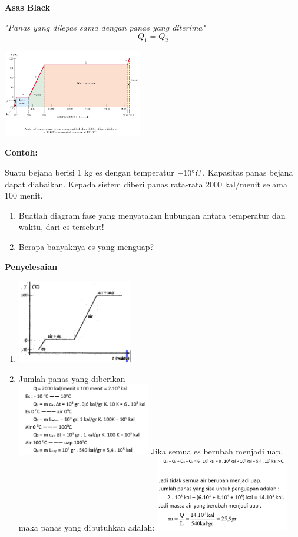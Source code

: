 \documentclass[twocolumn, 11pt]{article}%
\begin{document}
        \textbf{Asas Black}

        \textit{"Panas yang dilepas sama dengan panas yang diterima"}
        \[Q_1 = Q_2 \]

        \begin{center}
            \includegraphics[width=230px]{7.png}
        \end{center}

        \textbf{Contoh:}

        Suatu bejana berisi 1 kg es dengan temperatur $-10\degree C$. Kapasitas panas bejana dapat diabaikan. Kepada sistem diberi panas rata-rata 2000 kal/menit selama 100 menit.
        \begin{enumerate}[label=\alph*)]
            \item Buatlah diagram fase yang menyatakan hubungan antara temperatur dan waktu, dari es tersebut!
            \item Berapa banyaknya es yang menguap?
        \end{enumerate}

        \textbf{\underline{Penyelesaian}}
        \begin{enumerate}[label=\alph*)]
            \item \includegraphics[width=190px]{8.png}
            \item Jumlah panas yang diberikan\\
                \includegraphics[width=220px]{9.png}
                Jika semua es berubah menjadi uap, maka panas yang dibutuhkan adalah:
                \includegraphics[width=220px]{10.png}
        \end{enumerate}
\end{document}

